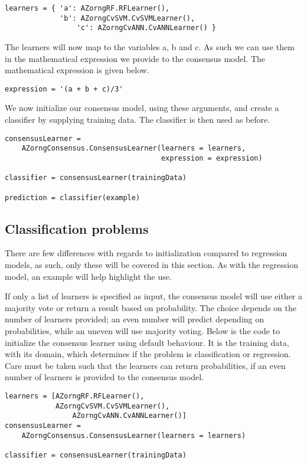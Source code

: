 \documentclass[12pt]{article}
\begin{document}
\begin{verbatim}
learners = { 'a': AZorngRF.RFLearner(), 
             'b': AZorngCvSVM.CvSVMLearner(),
	             'c': AZorngCvANN.CvANNLearner() }
\end{verbatim}

The learners will now map to the variables a, b and c. As such we can use them in
the mathematical expression we provide to the consensus model. The mathematical 
expression is given below.

\begin{verbatim}
expression = '(a + b + c)/3'
\end{verbatim}

We now initialize our consensus model, using these arguments, and create a
classifier by supplying training data. The classifier is then used as before.

\begin{verbatim}
consensusLearner = 
    AZorngConsensus.ConsensusLearner(learners = learners, 
                                     expression = expression)

classifier = consensusLearner(trainingData)

prediction = classifier(example)
\end{verbatim}

\newpage
\subsection{Classification problems}

There are few differences with regards to initialization compared to regression
models, as such, only these will be covered in this section. As with the regression
model, an example will help highlight the use.

If only a list of learners is specified as input, the consensus model will use
either a majority vote or return a result based on probability. The choice depends
on the number of learners provided; an even number will predict depending on probabilities,
while an uneven will use majority voting. Below is the code to initialize the consensus
learner using default behaviour. It is the training data, with its domain, which determines
if the problem is classification or regression. Care must be taken such that the learners
can return probabilities, if an even number of learners is provided to the consensus model.

\begin{verbatim}
learners = [AZorngRF.RFLearner(), 
            AZorngCvSVM.CvSVMLearner(),
	            AZorngCvANN.CvANNLearner()]
consensusLearner = 
    AZorngConsensus.ConsensusLearner(learners = learners)

classifier = consensusLearner(trainingData)
\end{verbatim}
\end{document}
